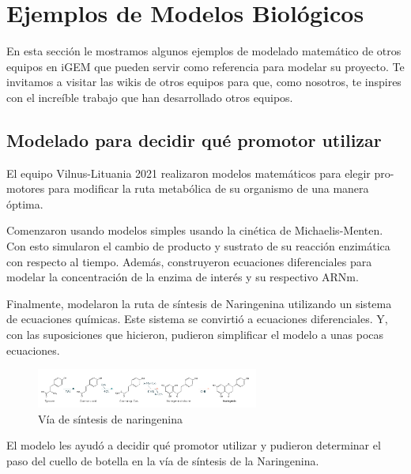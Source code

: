 \documentclass[11pt, letterpaper, spanish]{article}
\begin{document}
{{  \newpage  





 
    
\newpage

\section{Ejemplos de Modelos Biológicos}
\par{En esta sección le mostramos algunos ejemplos de modelado matemático de otros equipos en iGEM que pueden servir como
referencia para modelar su proyecto. Te invitamos a visitar las wikis de otros equipos para que, como nosotros, te inspires con el
increíble trabajo que han desarrollado otros equipos.}
\subsection{Modelado para decidir qué promotor utilizar}
\par{El equipo Vilnus-Lituania 2021 realizaron modelos matemáticos para elegir pro-motores para modificar la ruta metabólica de su
organismo de una manera óptima.}

\par{Comenzaron usando modelos simples usando la cinética de Michaelis-Menten. Con esto simularon el cambio de producto y
sustrato de su reacción enzimática con respecto al tiempo. Además, construyeron ecuaciones diferenciales para modelar la
concentración de la enzima de interés y su respectivo ARNm.}

\par{Finalmente, modelaron la ruta de síntesis de Naringenina utilizando un sistema de ecuaciones químicas. Este sistema se convirtió a ecuaciones diferenciales. Y, con las suposiciones que hicieron, pudieron simplificar el modelo a unas pocas ecuaciones.}

\begin{figure}
	    \centering
		\caption{Vía de síntesis de naringenina}
		\includegraphics[width=0.65\textwidth]{Vilnus.png}
	\end{figure}


\par{El modelo les ayudó a decidir qué promotor utilizar y pudieron determinar el paso del cuello de botella en la vía de síntesis de la Naringenina.}
    
}}
\end{document}
